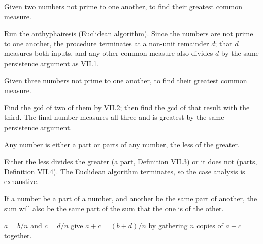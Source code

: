 \documentclass{rrxiv}
\begin{document}
\begin{claim}
\label{prop:VII.2}
Given two numbers not prime to one another, to find their greatest
common measure.
\end{claim}
\begin{evidence}
\label{ev:VII.2}
Run the anthyphairesis (Euclidean algorithm).  Since the numbers are
not prime to one another, the procedure terminates at a non-unit
remainder $d$; that $d$ measures both inputs, and any other common
measure also divides $d$ by the same persistence argument as VII.1.
\end{evidence}

\begin{claim}
\label{prop:VII.3}
Given three numbers not prime to one another, to find their greatest
common measure.
\end{claim}
\begin{evidence}
\label{ev:VII.3}
Find the gcd of two of them by VII.2; then find the gcd of that
result with the third.  The final number measures all three and is
greatest by the same persistence argument.
\end{evidence}

\begin{claim}
\label{prop:VII.4}
Any number is either a part or parts of any number, the less of the
greater.
\end{claim}
\begin{evidence}
\label{ev:VII.4}
Either the less divides the greater (a part, Definition VII.3) or it
does not (parts, Definition VII.4).  The Euclidean algorithm
terminates, so the case analysis is exhaustive.
\end{evidence}

\begin{claim}
\label{prop:VII.5}
If a number be a part of a number, and another be the same part of
another, the sum will also be the same part of the sum that the one
is of the other.
\end{claim}
\begin{evidence}
\label{ev:VII.5}
$a = b/n$ and $c = d/n$ give $a + c = (b + d)/n$ by gathering $n$
copies of $a + c$ together.
\end{evidence}
\end{document}
